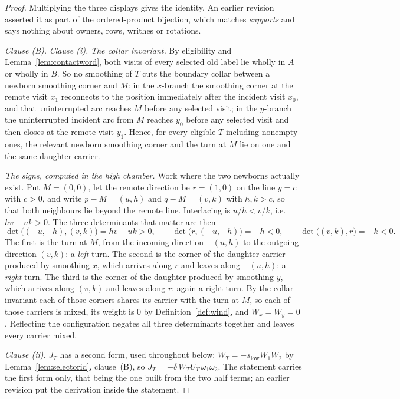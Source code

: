 \begin{proof}
Multiplying the three displays gives the identity. An earlier revision asserted
it as part of the ordered-product bijection, which matches \emph{supports} and
says nothing about owners, rows, writhes or rotations.

\emph{Clause (B).} \emph{Clause (i).}
\emph{The collar invariant.} By eligibility and Lemma~\ref{lem:contactword},
both visits of every selected old label lie wholly in $A$ or wholly in $B$. So
no smoothing of $T$ cuts the boundary collar between a newborn smoothing corner
and $M$: in the $x$-branch the smoothing corner at the remote visit $x_1$
reconnects to the position immediately after the incident visit $x_0$, and that
uninterrupted arc reaches $M$ before any selected visit; in the $y$-branch the
uninterrupted incident arc from $M$ reaches $y_0$ before any selected visit and
then closes at the remote visit $y_1$. Hence, for every eligible $T$ including
nonempty ones, the relevant newborn smoothing corner and the turn at $M$ lie on
one and the same daughter carrier.

\emph{The signs, computed in the high chamber.} Work where the two newborns
actually exist. Put $M=(0,0)$, let the remote direction be $r=(1,0)$ on the line
$y=c$ with $c>0$, and write $p-M=(u,h)$ and $q-M=(v,k)$ with $h,k>c$, so that
both neighbours lie beyond the remote line. Interlacing is $u/h<v/k$, i.e.\
$hv-uk>0$. The three determinants that matter are then
\[
   \det\bigl((-u,-h),(v,k)\bigr)=hv-uk>0,
   \qquad
   \det\bigl(r,(-u,-h)\bigr)=-h<0,
   \qquad
   \det\bigl((v,k),r\bigr)=-k<0 .
\]
The first is the turn at $M$, from the incoming direction $-(u,h)$ to the
outgoing direction $(v,k)$: a \emph{left} turn. The second is the corner of the
daughter carrier produced by smoothing $x$, which arrives along $r$ and leaves
along $-(u,h)$: a \emph{right} turn. The third is the corner of the daughter
produced by smoothing $y$, which arrives along $(v,k)$ and leaves along $r$:
again a right turn. By the collar invariant each of those corners shares its
carrier with the turn at $M$, so each of those carriers is mixed, its weight is
$0$ by Definition~\ref{def:wind}, and $W_x=W_y=0$. Reflecting the configuration
negates all three determinants together and leaves every carrier mixed.


\emph{Clause (ii).}
$J_T$ has a second form, used throughout below:
$W_T=-s_{\mathrm{low}}W_1W_2$ by Lemma~\ref{lem:selectorid}, clause~(B), so
$J_T=-\delta\,W_TU_T\,\omega_1\omega_2$. The statement carries the first form
only, that being the one built from the two half terms; an earlier revision put
the derivation inside the statement.


\end{proof}

